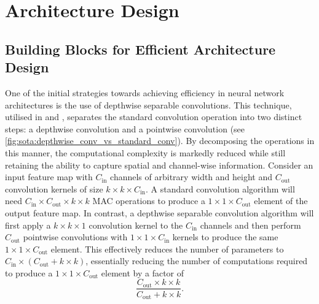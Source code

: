 \section{Architecture Design}

\subsection{Building Blocks for Efficient Architecture Design}
\label{sec:sota:efficient_archi}

One of the initial strategies towards achieving efficiency in neural network
architectures is the use of depthwise separable convolutions. This technique,
utilised in \cite{howard2017mobilenets} and \cite{DBLP:conf/icml/TanL19},
separates the standard convolution operation into two distinct steps: a
depthwise convolution and a pointwise convolution (see
\cref{fig:sota:depthwise_conv_vs_standard_conv}). By decomposing the operations
in this manner, the computational complexity is markedly reduced while still
retaining the ability to capture spatial and channel-wise information. Consider
an input feature map with $C_\text{in}$ channels of arbitrary width and height
and $C_\text{out}$ convolution kernels of size $k\times k \times C_\text{in}$. A
standard convolution algorithm will need $C_\text{in} \times C_\text{out} \times
k \times k$ \ac{MAC} operations to produce a $1 \times 1 \times C_\text{out}$
element of the output feature map. In contrast, a depthwise separable
convolution algorithm will first apply a $k\times k \times 1$ convolution kernel
to the $C_\text{in}$ channels and then perform $C_\text{out}$ pointwise
convolutions with $1\times 1 \times C_\text{in}$ kernels to produce the same
$1\times 1 \times C_\text{out}$ element. This effectively reduces the number of
parameters to $C_\text{in} \times (C_\text{out} + k \times k)$, essentially
reducing the number of computations required to produce a $1 \times 1 \times
C_\text{out}$ element by a factor of\\

$$\displaystyle\frac{C_\text{out}\times k \times k}{C_\text{out} + k \times k}.$$\\

